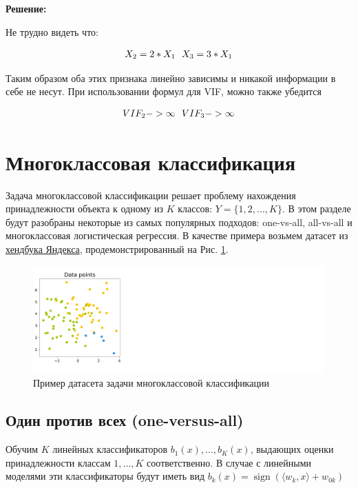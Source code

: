 \begin{itemize}
\textbf{Решение:}

Не трудно видеть что:

\begin{align}
X_{2} = 2*X_{1} \text{\space\space} X_{3} = 3*X_{1}
\end{align}

Таким образом оба этих признака линейно зависимы и никакой информации в себе не несут. При использовании формул для VIF, можно также убедится

\begin{align}
VIF_{2} -> \infty \text{\space\space} VIF_{3}-> \infty
\end{align}
\section{Многоклассовая классификация}

Задача многоклассовой классификации решает проблему нахождения принадлежности объекта к одному из $K$ классов: $Y = \{1, 2, ..., K\}$. В этом разделе будут разобраны некоторые из самых популярных подходов: one-vs-all, all-vs-all и многоклассовая логистическая регрессия. В качестве примера возьмем датасет из \href{https://education.yandex.ru/handbook/ml/article/linear-models}{хендбука Яндекса}, продемонстрированный на Рис. \ref{fig:linear-multi-dataset}.

\begin{figure}[h]
	\centering
	\includegraphics[width=0.8\linewidth]{chapters/linear/pics/multi-dataset.png}
	\caption{Пример датасета задачи многоклассовой классификации}
	\label{fig:linear-multi-dataset}
\end{figure}

\subsection{Один против всех (one-versus-all)}

Обучим $K$ линейных классификаторов $b_1(x),...,b_K(x)$, выдающих оценки принадлежности классам $1,...,K$ соответственно. В случае с линейными моделями эти классификаторы будут иметь вид $b_k(x) = \operatorname{sign}(\langle w_k, x \rangle+w_{0k})$


\end{itemize}
